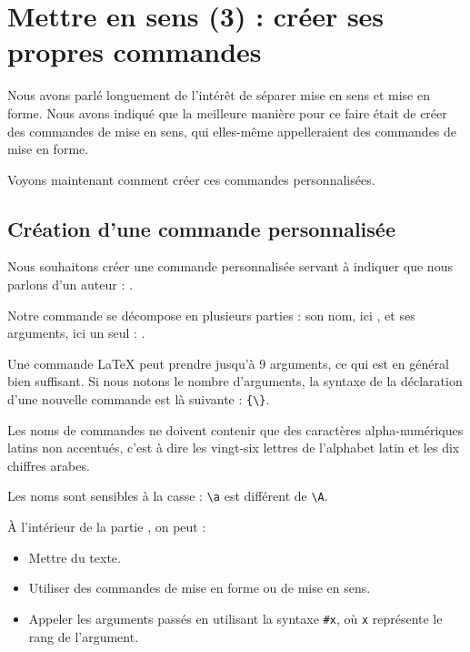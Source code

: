 \chapter{Mettre en sens (3) : créer ses propres commandes}\label{creercommandes}

\begin{prealable}
Nous avons parlé longuement de l'intérêt de séparer mise en sens et mise en forme.
Nous avons indiqué que la meilleure manière pour ce faire était de créer des commandes de mise en sens, qui elles-même appelleraient des commandes de mise en forme.

Voyons maintenant comment créer ces commandes personnalisées.
\end{prealable}

\section{Création d'une commande personnalisée}

Nous souhaitons créer une commande personnalisée servant à indiquer que nous parlons d'un auteur : .

Notre commande se décompose en plusieurs parties : son nom, ici , et ses arguments, ici un seul : .

Une commande LaTeX peut prendre jusqu'à 9 arguments, ce qui est en général bien suffisant. Si nous notons  le nombre d'arguments, la syntaxe de la déclaration d'une nouvelle commande est là suivante :
\verb|{\|\verb|}|.

\begin{attention}
	Les noms de commandes ne doivent contenir que des caractères alpha-numériques latins non accentués, c'est à dire les vingt-six lettres de l'alphabet latin et les dix chiffres arabes. 
	
	Les noms sont sensibles à la casse : \verb|\a| est différent de \verb|\A|.
\end{attention}
À l'intérieur de la partie , on peut  :
\begin{itemize}
	\item Mettre du texte.
	\item Utiliser des commandes de mise en forme ou de mise en sens.
	\item Appeler les arguments passés en utilisant la syntaxe \verb|#x|, où \verb|x| représente le rang de l'argument.
\end{itemize}

